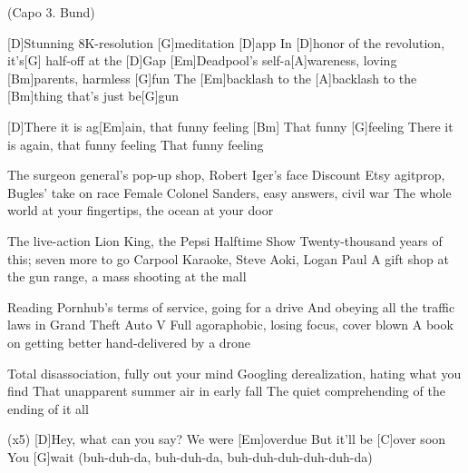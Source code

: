 
{ \footnotesize(Capo 3. Bund)}

\begin{guitar}
	[D]Stunning 8K-resolution [G]meditation [D]app
	In [D]honor of the revolution, it's[G] half-off at the [D]Gap
	[Em]Deadpool's self-a[A]wareness, loving [Bm]parents, harmless [G]fun
	The [Em]backlash to the [A]backlash to the [Bm]thing that's just be[G]gun
	
	[D]There it is ag[Em]ain, that funny feeling
	[Bm] That funny [G]feeling
	There it is again, that funny feeling
	That funny feeling
	
	The surgeon general's pop-up shop, Robert Iger's face
	Discount Etsy agitprop, Bugles' take on race
	Female Colonel Sanders, easy answers, civil war
	The whole world at your fingertips, the ocean at your door
	
	The live-action Lion King, the Pepsi Halftime Show
	Twenty-thousand years of this; seven more to go
	Carpool Karaoke, Steve Aoki, Logan Paul
	A gift shop at the gun range, a mass shooting at the mall
	
	 
	
	Reading Pornhub's terms of service, going for a drive
	And obeying all the traffic laws in Grand Theft Auto V
	Full agoraphobic, losing focus, cover blown
	A book on getting better hand-delivered by a drone
	
	Total disassociation, fully out your mind
	Googling derealization, hating what you find
	That unapparent summer air in early fall
	The quiet comprehending of the ending of it all
	
	 
	\pagebreak
	 (x5) 
	[D]Hey, what can you say?
	We were [Em]overdue
	But it'll be [C]over soon
	You [G]wait (buh-duh-da, buh-duh-da, buh-duh-duh-duh-duh-da)
\end{guitar}